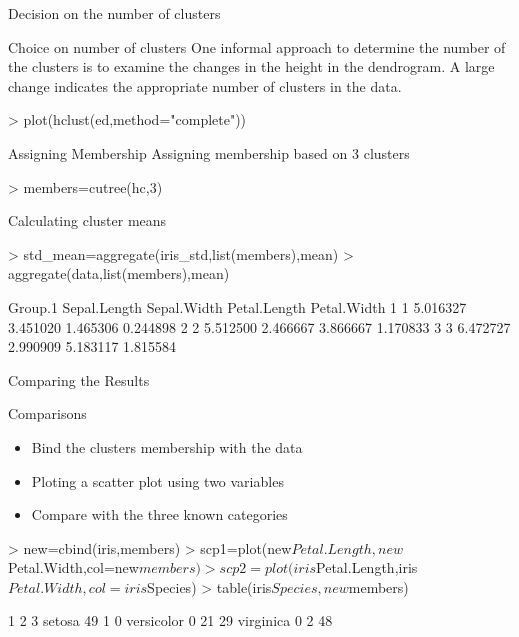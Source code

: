 \documentclass[10pt]{beamer}
\begin{document}
\begin{frame}[fragile]{Decision on the number of clusters}
\begin{block}{Choice on number of clusters}
One informal approach to determine the number of the clusters is to examine the changes in the height in the dendrogram. A large change indicates the appropriate number of clusters in the data.
\begin{Schunk}
\begin{Sinput}
> plot(hclust(ed,method="complete"))
\end{Sinput}
\end{Schunk}

\end{block}
\begin{block}{Assigning Membership}
Assigning membership based on 3 clusters
\begin{Schunk}
\begin{Sinput}
> members=cutree(hc,3)
\end{Sinput}
\end{Schunk}
Calculating cluster means
\begin{Schunk}
\begin{Sinput}
> std_mean=aggregate(iris_std,list(members),mean)
> aggregate(data,list(members),mean)
\end{Sinput}
\begin{Soutput}
  Group.1 Sepal.Length Sepal.Width Petal.Length Petal.Width
1       1     5.016327    3.451020     1.465306    0.244898
2       2     5.512500    2.466667     3.866667    1.170833
3       3     6.472727    2.990909     5.183117    1.815584
\end{Soutput}
\end{Schunk}

\end{block}
\end{frame}

\begin{frame}[fragile]{Comparing the Results}
\begin{block}{Comparisons}
\begin{itemize}
\item Bind the clusters membership with the data
\item Ploting a scatter plot using two variables
\item Compare with the three known categories
\end{itemize}

\begin{Schunk}
\begin{Sinput}
> new=cbind(iris,members)
> scp1=plot(new$Petal.Length,new$Petal.Width,col=new$members)
> scp2=plot(iris$Petal.Length,iris$Petal.Width, col=iris$Species)
> table(iris$Species,new$members)
\end{Sinput}
\begin{Soutput}
              1  2  3
  setosa     49  1  0
  versicolor  0 21 29
  virginica   0  2 48
\end{Soutput}
\end{Schunk}
\end{block}
\end{frame}
\end{document}
